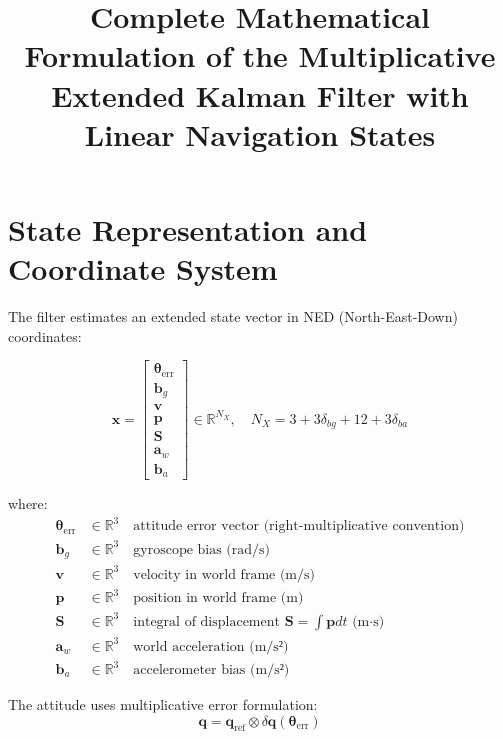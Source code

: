\documentclass{article}
\newcommand{\vect}[1]{\bm{#1}}
\newcommand{\quat}[1]{\mathbf{#1}}
\newcommand{\R}{\mathbb{R}}
\begin{document}
\title{Complete Mathematical Formulation of the Multiplicative Extended Kalman Filter with Linear Navigation States}
\author{}
\maketitle

\section{State Representation and Coordinate System}

The filter estimates an extended state vector in NED (North-East-Down) coordinates:

\begin{equation}
\vect{x} = 
\begin{bmatrix}
\vect{\theta}_{\text{err}} \\
\vect{b}_g \\
\vect{v} \\
\vect{p} \\
\vect{S} \\
\vect{a}_w \\
\vect{b}_a
\end{bmatrix}
\in \R^{N_X}, \quad 
N_X = 3 + 3\delta_{bg} + 12 + 3\delta_{ba}
\end{equation}

where:
\begin{align*}
\vect{\theta}_{\text{err}} &\in \R^3 \quad \text{attitude error vector (right-multiplicative convention)} \\
\vect{b}_g &\in \R^3 \quad \text{gyroscope bias (rad/s)} \\
\vect{v} &\in \R^3 \quad \text{velocity in world frame (m/s)} \\
\vect{p} &\in \R^3 \quad \text{position in world frame (m)} \\
\vect{S} &\in \R^3 \quad \text{integral of displacement } \vect{S} = \int \vect{p}  dt \text{ (m·s)} \\
\vect{a}_w &\in \R^3 \quad \text{world acceleration (m/s²)} \\
\vect{b}_a &\in \R^3 \quad \text{accelerometer bias (m/s²)}
\end{align*}

The attitude uses multiplicative error formulation:
\begin{equation}
\quat{q} = \quat{q}_{\text{ref}} \otimes \delta\quat{q}(\vect{\theta}_{\text{err}})
\end{equation}
\end{document}
